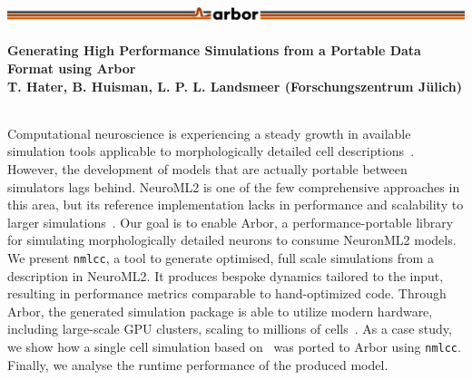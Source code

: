 \documentclass{beamer}
\begin{document}
\newcommand{\nmlcc}{\texttt{nmlcc}}
\newcommand\cpp{C\nolinebreak[4]\hspace{-.05em}\raisebox{.4ex}{\relsize{-3}{\textbf{++}}}}
\newcommand\cppemph{C\nolinebreak[4]\hspace{-.05em}\raisebox{.4ex}{\relsize{-3}{\textit{++}}}}

\begin{frame}[t, fragile]
  \frametitle{\includegraphics[width=0.66\linewidth]{img/arbor-lines-proto-colour-full}}
  \framesubtitle{Generating High Performance Simulations from a Portable Data Format using Arbor\\
    \tiny{T. Hater, B. Huisman, L. P. L. Landsmeer (Forschungszentrum Jülich)}}
  \begin{columns}[onlytextwidth,T]
    \begin{column}{0.76\textwidth}
      Computational neuroscience is experiencing a steady growth in available
      simulation tools applicable to morphologically detailed cell
      descriptions~\cite{eden, neurogpu, carl, brian, arb, nrn}. However, the
      development of models that are actually portable between simulators lags
      behind. NeuroML2 is one of the few comprehensive approaches in this area,
      but its reference implementation lacks in performance and scalability to
      larger simulations~\cite{nml2}. Our goal is to enable Arbor, a
      performance-portable library for simulating morphologically detailed
      neurons to consume NeuronML2 models. We present \nmlcc, a tool to generate
      optimised, full scale simulations from a description in NeuroML2. It
      produces bespoke dynamics tailored to the input, resulting in performance
      metrics comparable to hand-optimized code. Through Arbor, the generated
      simulation package is able to utilize modern hardware, including
      large-scale GPU clusters, scaling to millions of cells~\cite{arb}. As a
      case study, we show how a single cell simulation based on~\cite{Hay} was
      ported to Arbor using \nmlcc. Finally, we analyse the runtime performance
      of the produced model.


\end{column}
\end{columns}
\end{frame}
\end{document}
